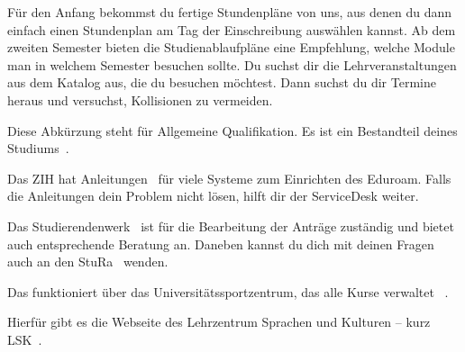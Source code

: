 Für den Anfang bekommst du fertige Stundenpläne von uns, aus denen du dann einfach einen Stundenplan am Tag der Einschreibung auswählen kannst. Ab dem zweiten Semester bieten die Studienablaufpläne eine Empfehlung, welche Module man in welchem Semester besuchen sollte. Du suchst dir die Lehrveranstaltungen aus dem Katalog aus, die du besuchen möchtest. Dann suchst du dir Termine heraus und versuchst, Kollisionen zu vermeiden.

Diese Abkürzung steht für Allgemeine Qualifikation. Es ist ein Bestandteil deines Studiums~.


Das ZIH hat Anleitungen~ für viele Systeme zum Einrichten des Eduroam. Falls die Anleitungen dein Problem nicht lösen, hilft dir der ServiceDesk weiter.

Das Studierendenwerk~ ist für die Bearbeitung der Anträge zuständig und bietet auch entsprechende Beratung an. Daneben kannst du dich mit deinen Fragen auch an den StuRa~ wenden.

Das funktioniert über das Universitätssportzentrum, das alle Kurse verwaltet~ .

Hierfür gibt es die Webseite des Lehrzentrum Sprachen und Kulturen -- kurz LSK~.

